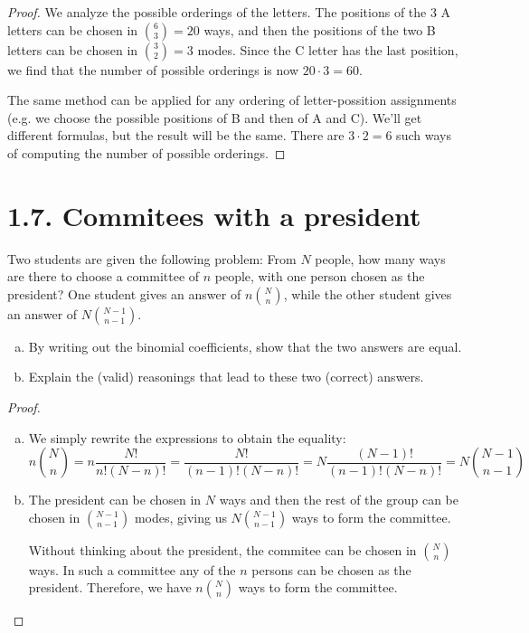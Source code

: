 \vspace{1em}

\begin{proof}
    We analyze the possible orderings of the letters. The positions of the 3 A letters can be chosen 
    in $\binom{6}{3} = 20$ ways, and then the positions of the two B letters can be chosen in
    $\binom{3}{2} = 3$ modes. Since the C letter has the last position, we find that the number of possible
    orderings is now $20 \cdot 3 = 60$.

    The same method can be applied for any ordering of letter-possition assignments (e.g. we choose the 
    possible positions of B and then of A and C). We'll get different formulas, but the result will be the
    same. There are $3 \cdot 2 = 6$ such ways of computing the number of possible orderings.
\end{proof}

\section*{1.7. Commitees with a president}
Two students are given the following problem: From $N$ people, how many ways are there to choose a committee
of $n$ people, with one person chosen as the president? One student gives an answer of $n\binom{N}{n}$, while
the other student gives an answer of $N\binom{N-1}{n-1}$.

\begin{enumerate}[(a)]
    \item By writing out the binomial coefficients, show that the two answers are equal.
    \item Explain the (valid) reasonings that lead to these two (correct) answers.
\end{enumerate}

\vspace{1em}

\begin{proof}
    \hfill
    \begin{enumerate}[(a)]
        \item We simply rewrite the expressions to obtain the equality:
        \[
            n\binom{N}{n} = n\frac{N!}{n!(N-n)!} = \frac{N!}{(n-1)!(N-n)!} = N\frac{(N-1)!}{(n-1)!(N-n)!}
                          = N\binom{N-1}{n-1}
        \]
        \item The president can be chosen in $N$ ways and then the rest of the group can be chosen in 
            $\binom{N-1}{n-1}$ modes, giving us $N\binom{N-1}{n-1}$ ways to form the committee.

            Without thinking about the president, the commitee can be chosen in $\binom{N}{n}$ ways. In 
            such a committee any of the $n$ persons can be chosen as the president. Therefore, we have 
            $n\binom{N}{n}$ ways to form the committee.
    \end{enumerate}
\end{proof}

